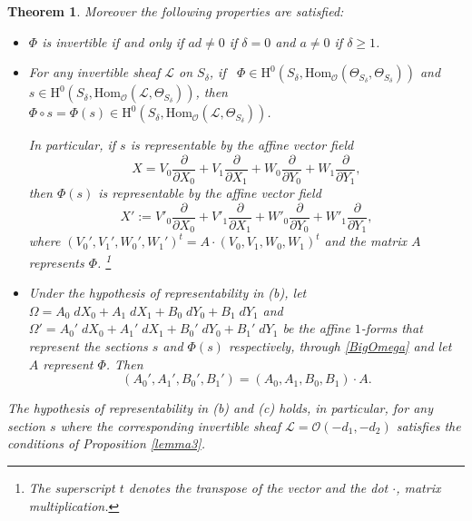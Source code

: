 \documentclass{amsart} %
\newtheorem{theorem}{Theorem}[section]
\theoremstyle{definition}
\newcommand{\cts}{\Theta_{S_{\delta}}}
\newcommand{\cs}{S_{\delta}}
\newcommand{\mcL}{\mathcal{L}}
\newcommand{\mcO}{\mathcal{O}}
\begin{document}
\begin{theorem}
Moreover the following properties are satisfied:
 \begin{itemize}
\item[(a)] $\Phi$ is invertible if and only if $a d\neq 0$ if $ \delta = 0 $ and $a\neq 0$ if $ \delta \geq 1 $.
\item[(b)] For any invertible sheaf $ \mcL $ on $ \cs $, if \,
 $ \Phi \in \text{H}^0(S_{\delta},\mathrm{Hom}_{ \mcO} (\cts, \cts)) $ and\\
 $ s \in \text{H}^{0}( S_{\delta}, \mathrm{Hom}_{ \mcO} (\mcL , \cts) )$, then
 $ \Phi \circ s = \Phi( s )
 \in \text{H}^{0}( S_{\delta}, \mathrm{Hom}_{ \mcO} (\mcL , \cts) )$.

 In particular, if $ s $ is representable by the affine vector field
 \[
 X = V_0\frac{\partial}{\partial X_0}+V_1\frac{\partial}{\partial X_1}
    + W_0\frac{\partial}{\partial Y_0}+W_1\frac{\partial}{\partial Y_1},
 \]
 then $ \Phi(s) $ is representable by the affine vector field
 \[
 X':=V'_0\frac{\partial}{\partial X_0}+V'_1\frac{\partial}{\partial X_1}+W'_0\frac{\partial}{\partial Y_0}+W'_1\frac{\partial}{\partial Y_1},
 \]
 where $(V_0',V_1',W_0',W_1')^t = A \cdot (V_0,V_1,W_0,W_1)^t$ and the matrix $ A $ represents $ \Phi $.
 \footnote{The superscript $t$ denotes the transpose of the vector and the dot $ \cdot $, matrix multiplication.}
 \item[(c)] Under the hypothesis of representability in (b), let
 $ \Omega = A_0\;dX_0+A_1\; dX_1+B_0\; dY_0+ B_1\;dY_1 $ and
 $ \Omega' = A_0'\;dX_0+A_1'\; dX_1+B_0'\; dY_0+ B_1'\;dY_1 $ be the affine $1$-forms that represent the
 sections $ s $ and $ \Phi( s ) $ respectively, through \eqref{BigOmega} and let $ A $ represent $ \Phi $. Then
 $$( A_0',A_1',B_0', B_1' ) = ( A_0,A_1,B_0, B_1 )\cdot A. $$
 \end{itemize}
 The hypothesis of representability in (b) and (c) holds, in particular, for any  section $ s $ where the corresponding invertible sheaf $\mathcal L = \mcO(-d_1,-d_2)$ satisfies the conditions of Proposition \ref{lemma3}.

 \end{theorem}
\end{document}
